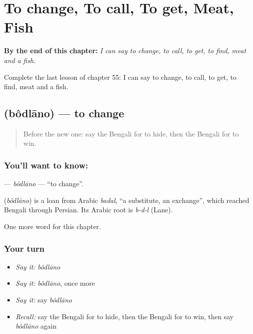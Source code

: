 
\chapter{To change, To call, To get, Meat, Fish}
\label{ch:bn-to-change-to-call-to-get-meat-fish}

\begin{chapteropening}
\textbf{By the end of this chapter:} \emph{I can say to change, to call, to get, to find, meat and a fish.}

Complete the last lesson of chapter 55: I can say to change, to call, to get, to find, meat and a fish.
\end{chapteropening}

\section[\texorpdfstring{\bn{বদলানো} (bôdlāno)}{বদলানো (bôdlāno)}]{ (bôdlāno) — to change}

\label{lesson:BN-C55-bodlano}



\begin{quote}
Before the new one: say the Bengali for to hide, then the Bengali for to win.
\end{quote}

\subsection*{You'll want to know: }
\textbf{} — \emph{bôdlāno} — \textquotedblleft{}to change\textquotedblright{}.

\begin{cousinweb}
\textbf{} (\emph{bôdlāno}) is a loan from Arabic \emph{badal}, \textquotedblleft{}a substitute, an exchange\textquotedblright{}, which reached Bengali through Persian. Its Arabic root is \emph{b-d-l} (Lane).
\end{cousinweb}

\begin{grammarlens}[title={What you've built}]
One more word for this chapter.
\end{grammarlens}

\subsection*{Your turn}
\begin{itemize}
\raggedright
  \item \emph{Say it:} \emph{bôdlāno}
  \item \emph{Say it:} \emph{bôdlāno}, once more
  \item \emph{Say it:} say \emph{bôdlāno}
  \item \emph{Recall:} say the Bengali for to hide, then the Bengali for to win, then say \emph{bôdlāno} again
\end{itemize}

